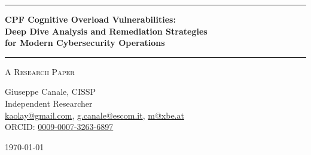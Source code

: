 \documentclass[11pt,a4paper]{article}
\begin{document}
\thispagestyle{empty}
\begin{center}

\vspace*{0.5cm}

\rule{\textwidth}{1.5pt}

\vspace{0.5cm}

{\LARGE \textbf{CPF Cognitive Overload Vulnerabilities:}}\\[0.3cm]
{\LARGE \textbf{Deep Dive Analysis and Remediation Strategies}}\\[0.3cm]
{\LARGE \textbf{for Modern Cybersecurity Operations}}

\vspace{0.5cm}

\rule{\textwidth}{1.5pt}

\vspace{0.3cm}

{\large \textsc{A Research Paper}}

\vspace{0.5cm}

{\Large Giuseppe Canale, CISSP}\\[0.2cm]
Independent Researcher\\[0.1cm]
\href{mailto:kaolay@gmail.com}{kaolay@gmail.com}, 
\href{mailto:g.canale@escom.it}{g.canale@escom.it}, 
\href{mailto:m8xbe.at}{m@xbe.at}\\[0.1cm]
ORCID: \href{https://orcid.org/0009-0007-3263-6897}{0009-0007-3263-6897}

\vspace{0.8cm}

{\large \today}

\vspace{1cm}

\end{center}
\end{document}
